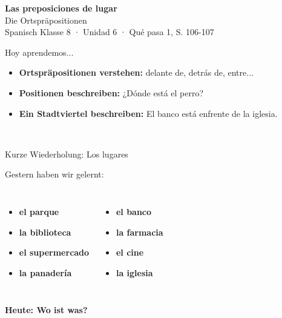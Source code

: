 \documentclass[aspectratio=169,11pt]{beamer}
\newcommand{\es}[1]{\textcolor{spanisch}{\textbf{#1}}}
\newcommand{\phase}[1]{\begin{center}\colorbox{spanisch}{\textcolor{white}{\large\bfseries #1}}\end{center}}
\begin{document}
\begin{frame}
\begin{center}
\vspace{1cm}
{\Huge\bfseries\textcolor{spanisch}{Las preposiciones de lugar}}\\[0.5cm]
{\Large Die Ortspräpositionen}\\[1cm]
{\normalsize Spanisch Klasse 8 · Unidad 6 · Qué pasa 1, S. 106-107}
\end{center}
\end{frame}

\begin{frame}{Hoy aprendemos...}
\begin{itemize}
\setlength\itemsep{1em}
\item[\textcolor{spanisch}{\textbullet}] \textbf{Ortspräpositionen verstehen:} delante de, detrás de, entre...
\item[\textcolor{spanisch}{\textbullet}] \textbf{Positionen beschreiben:} ¿Dónde está el perro?
\item[\textcolor{spanisch}{\textbullet}] \textbf{Ein Stadtviertel beschreiben:} El banco está enfrente de la iglesia.
\end{itemize}
\end{frame}


\begin{frame}{}
\phase{Einstieg: Wiederholung}
\end{frame}

\begin{frame}{Kurze Wiederholung: Los lugares}
\begin{center}
{\Large Gestern haben wir gelernt:}\\[0.8cm]
\begin{columns}
\begin{itemize}
\item \es{el parque}
\item \es{la biblioteca}
\item \es{el supermercado}
\item \es{la panadería}
\end{itemize}

\begin{itemize}
\item \es{el banco}
\item \es{la farmacia}
\item \es{el cine}
\item \es{la iglesia}
\end{itemize}
\end{columns}
\vspace{0.8cm}
{\Large\bfseries Heute: Wo ist was?}
\end{center}
\end{frame}
\end{document}
